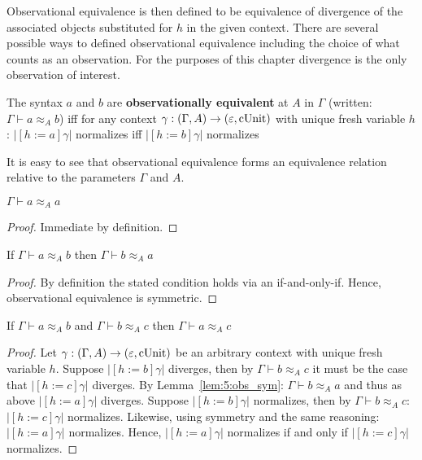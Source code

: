 Observational equivalence is then defined to be equivalence of divergence of the associated objects substituted for $h$ in the given context.
There are several possible ways to defined observational equivalence including the choice of what counts as an observation.
For the purposes of this chapter divergence is the only observation of interest.

\begin{definition}
    The syntax $a$ and $b$ are \textbf{observationally equivalent} at $A$ in $\Gamma$ (written: $\Gamma \vdash a \approx_A b$) iff
    for any context $\gamma : (\Gamma, A) \to (\varepsilon, \textnormal{cUnit})$ with unique fresh variable $h$: $|[h := a]\gamma|$ normalizes iff $|[h := b]\gamma|$ normalizes
\end{definition}

It is easy to see that observational equivalence forms an equivalence relation relative to the parameters $\Gamma$ and $A$.

\begin{lemma}
    \label{lem:5:obs_refl}
    $\Gamma \vdash a \approx_A a$
\end{lemma}
\begin{proof}
    Immediate by definition.
\end{proof}

\begin{lemma}
    \label{lem:5:obs_sym}
    If $\Gamma \vdash a \approx_A b$ then $\Gamma \vdash b \approx_A a$
\end{lemma}
\begin{proof}
    By definition the stated condition holds via an if-and-only-if.
    Hence, observational equivalence is symmetric.
\end{proof}

\begin{lemma}
    \label{lem:5:obs_trans}
    If $\Gamma \vdash a \approx_A b$ and $\Gamma \vdash b \approx_A c$ then $\Gamma \vdash a \approx_A c$
\end{lemma}
\begin{proof}
    Let $\gamma : (\Gamma, A) \to (\varepsilon, \textnormal{cUnit})$ be an arbitrary context with unique fresh variable $h$.
    Suppose $|[h := b]\gamma|$ diverges, then by $\Gamma \vdash b \approx_A c$ it must be the case that $|[h := c]\gamma|$ diverges.
    By Lemma~\ref{lem:5:obs_sym}: $\Gamma \vdash b \approx_A a$ and thus as above $|[h := a]\gamma|$ diverges.
    Suppose $|[h := b]\gamma|$ normalizes, then by $\Gamma \vdash b \approx_A c$: $|[h := c]\gamma|$ normalizes.
    Likewise, using symmetry and the same reasoning: $|[h := a]\gamma|$ normalizes.
    Hence, $|[h := a]\gamma|$ normalizes if and only if $|[h := c]\gamma|$ normalizes.
\end{proof}

